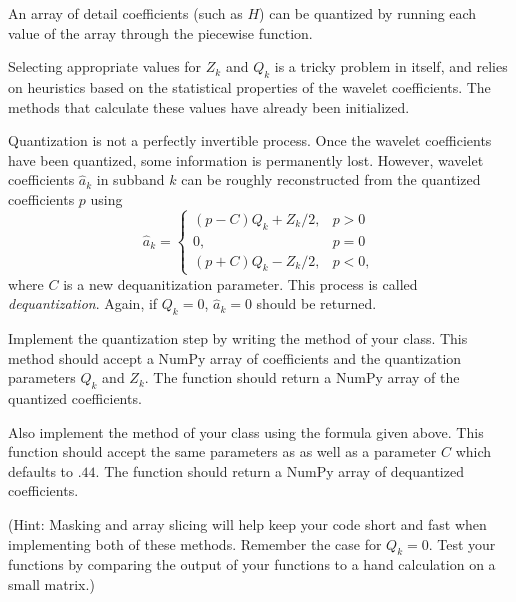 An array of detail coefficients (such as $H$) can be quantized by running each value of the array through the piecewise function.

Selecting appropriate values for $Z_k$ and $Q_k$ is a tricky problem in itself, and relies on heuristics based on the statistical properties of the wavelet coefficients.
The methods that calculate these values have already been initialized.

Quantization is not a perfectly invertible process.
Once the wavelet coefficients have been quantized, some information is permanently lost.
However, wavelet coefficients $\hat{a}_k$ in subband $k$ can be roughly reconstructed from the quantized coefficients $p$ using
\[
\hat{a}_k =
\begin{cases}
(p-C)Q_k + Z_k/2, & p> 0\\
0, & p = 0\\
(p + C)Q_k - Z_k/2, & p < 0,
\end{cases}
\]
where $C$ is a new dequanitization parameter.
This process is called \emph{dequantization}.
Again, if $Q_k = 0$, $\hat{a}_k = 0$ should be returned.

\begin{problem}
Implement the quantization step by writing the  method of your class.
This method should accept a NumPy array of coefficients and the quantization parameters $Q_k$ and $Z_k$.
The function should return a NumPy array of the quantized coefficients.

Also implement the  method of your class using the formula given above.
This function should accept the same parameters as  as well as a parameter $C$ which defaults to $.44$.
The function should return a NumPy array of dequantized coefficients.

(Hint: Masking and array slicing will help keep your code short and fast when implementing both of these methods.
Remember the case for $Q_k=0$.
Test your functions by comparing the output of your functions to a hand calculation on a small matrix.)
\end{problem}

